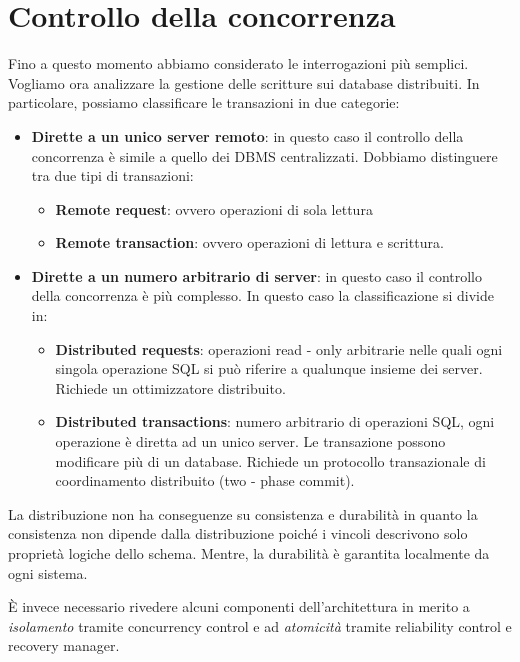 \section{Controllo della concorrenza}
Fino a questo momento abbiamo considerato le interrogazioni più semplici. Vogliamo
ora analizzare la gestione delle scritture sui database distribuiti. In particolare,
possiamo classificare le transazioni in due categorie:
\begin{itemize}
    \item \textbf{Dirette a un unico server remoto}: in questo caso il controllo
          della concorrenza è simile a quello dei DBMS centralizzati. Dobbiamo
          distinguere tra due tipi di transazioni:
          \begin{itemize}
              \item \textbf{Remote request}: ovvero operazioni di sola lettura
              \item \textbf{Remote transaction}: ovvero operazioni di lettura e scrittura.
          \end{itemize}
    \item \textbf{Dirette a un numero arbitrario di server}: in questo caso il
          controllo della concorrenza è più complesso. In questo caso la
          classificazione si divide in:
          \begin{itemize}
              \item \textbf{Distributed requests}: operazioni read - only
                    arbitrarie nelle quali ogni singola operazione SQL si può riferire
                    a qualunque insieme dei server. Richiede un ottimizzatore distribuito.
              \item \textbf{Distributed transactions}: numero arbitrario di
                    operazioni SQL, ogni operazione è diretta ad un unico server.
                    Le transazione possono modificare più di un database. Richiede
                    un protocollo transazionale di coordinamento distribuito (two
                    - phase commit).
          \end{itemize}
\end{itemize}

La distribuzione non ha conseguenze su consistenza e durabilità in quanto la
consistenza non dipende dalla distribuzione poiché i vincoli descrivono solo
proprietà logiche dello schema. Mentre, la durabilità è garantita localmente da
ogni sistema.

È invece necessario rivedere alcuni componenti dell'architettura in merito a
\textit{isolamento} tramite concurrency control e ad \textit{atomicità} tramite
reliability control e recovery manager.
